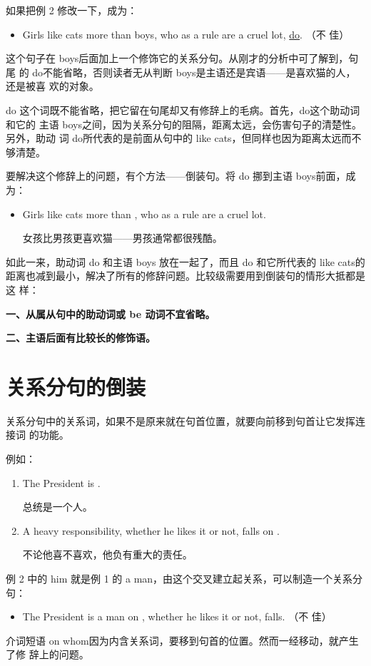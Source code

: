 如果把例 2 修改一下，成为：
\begin{itemize}
\item Girls like cats more than boys, who as a rule are a cruel lot, \ul{do}. （不
  佳）
\end{itemize}
这个句子在 boys后面加上一个修饰它的关系分句。从刚才的分析中可了解到，句尾
的 do不能省略，否则读者无从判断 boys是主语还是宾语——是喜欢猫的人，还是被喜
欢的对象。

do 这个词既不能省略，把它留在句尾却又有修辞上的毛病。首先，do这个助动词和它的
主语 boys之间，因为关系分句的阻隔，距离太远，会伤害句子的清楚性。另外，助动
词 do所代表的是前面从句中的 like cats，但同样也因为距离太远而不够清楚。

要解决这个修辞上的问题，有个方法——倒装句。将 do 挪到主语 boys前面，成为：
\begin{itemize}
\item Girls like cats more than , who as a rule are a cruel lot.

  女孩比男孩更喜欢猫——男孩通常都很残酷。
\end{itemize}

如此一来，助动词 do 和主语 boys 放在一起了，而且 do 和它所代表的 like cats的
距离也减到最小，解决了所有的修辞问题。比较级需要用到倒装句的情形大抵都是这
样：

\textbf{一、从属从句中的助动词或 be 动词不宜省略。}

\textbf{二、主语后面有比较长的修饰语。}

\section{关系分句的倒装}

关系分句中的关系词，如果不是原来就在句首位置，就要向前移到句首让它发挥连接词
的功能。

例如：
\begin{enumerate}
\item The President is .

  总统是一个人。
\item A heavy responsibility, whether he likes it or not, falls on .

  不论他喜不喜欢，他负有重大的责任。
\end{enumerate}
例 2 中的 him 就是例 1 的 a man，由这个交叉建立起关系，可以制造一个关系分句：
\begin{itemize}
\item The President is a man on  , whether he likes it or not, falls. （不
  佳）
\end{itemize}
介词短语 on whom因为内含关系词，要移到句首的位置。然而一经移动，就产生了修
辞上的问题。

